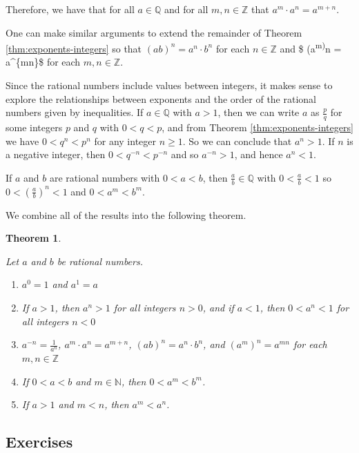 \documentclass[
]{book}
\newtheorem{theorem}{Theorem}[chapter]
\theoremstyle{definition}
\theoremstyle{definition}
\theoremstyle{definition}
\theoremstyle{definition}
\theoremstyle{remark}
\begin{document}
Therefore, we have that for all \(a\in \mathbb{Q}\) and for all \(m,n\in \mathbb{Z}\) that \(a^m\cdot a^n = a^{m+n}\).

One can make similar arguments to extend the remainder of Theorem \ref{thm:exponents-integers} so that \((ab)^n=a^n\cdot b^n\) for each \(n\in \mathbb{Z}\) and \$ (a\textsuperscript{m)}n = a\^{}\{mn\}\$ for each \(m,n\in \mathbb{Z}\).

Since the rational numbers include values between integers, it makes sense to explore the relationships between exponents and the order of the rational numbers given by inequalities. If \(a\in \mathbb{Q}\) with \(a>1\), then we can write \(a\) as \(\frac{p}{q}\) for some integers \(p\) and \(q\) with \(0<q<p\), and from Theorem \ref{thm:exponents-integers} we have \(0<q^n<p^n\) for any integer \(n\geq 1\). So we can conclude that \(a^n>1\). If \(n\) is a negative integer, then \(0<q^{-n}<p^{-n}\) and so \(a^{-n} >1\), and hence \(a^n<1\).

If \(a\) and \(b\) are rational numbers with \(0<a<b\), then \(\frac{a}{b}\in \mathbb{Q}\) with \(0<\frac{a}{b}<1\) so \(0<\left(\frac{a}{b}\right)^n<1\) and \(0<a^m<b^m\).

We combine all of the results into the following theorem.

\begin{theorem}
\protect\hypertarget{thm:exponents-rationals}{}\label{thm:exponents-rationals}

Let \(a\) and \(b\) be rational numbers.

\begin{enumerate}
\def\labelenumi{\arabic{enumi}.}
\item
  \(a^0=1\) and \(a^1=a\)
\item
  If \(a>1\), then \(a^n >1\) for all integers \(n>0\), and if \(a<1\), then \(0<a^n<1\) for all integers \(n<0\)
\item
  \(a^{-n} = \frac{1}{a^n}\), \(a^m\cdot a^n = a^{m+n}\), \((ab)^n=a^n\cdot b^n\), and \((a^m)^n = a^{mn}\) for each \(m,n\in \mathbb{Z}\)
\item
  If \(0<a<b\) and \(m\in \mathbb{N}\), then \(0<a^m<b^m\).
\item
  If \(a>1\) and \(m<n\), then \(a^m<a^n\).
\end{enumerate}

\end{theorem}

\hypertarget{exercises-12}{%
\subsection{Exercises}\label{exercises-12}}
\end{document}
